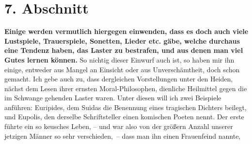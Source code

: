 \section{7. Abschnitt} \label{kap17_ab7}

\label{ref:17_07_einwand}
\textbf{Einige werden vermutlich hiergegen einwenden, dass es doch auch viele
Lustspiele, Trauerspiele, Sonetten, Lieder etc. gäbe, welche durchaus eine
Tendenz haben, das Laster zu bestrafen, und aus denen man viel Gutes lernen
können.} So nichtig dieser Einwurf auch ist, so haben mir ihn einige, entweder
aus
Mangel an Einsicht oder aus Unverschämtheit, doch schon gemacht. Ich gebe
auch zu, dass dergleichen Vorstellungen unter den Heiden, nächst dem Lesen ihrer
ernsten Moral-Philosophen, dienliche Heilmittel gegen die im Schwange gehenden
Laster waren. Unter diesen will ich zwei Beispiele anführen:
Euripides, dem
Suidas die Benennung eines tragischen Dichters beilegt, und
Eupolis, den
derselbe Schriftsteller einen komischen Poeten nennt. Der erste führte ein so
keusches Leben, -- und war also von der größern Anzahl unserer jetzigen Männer
so sehr verschieden,~-- dass man ihn einen
Frauenfeind nannte,

\medskip

